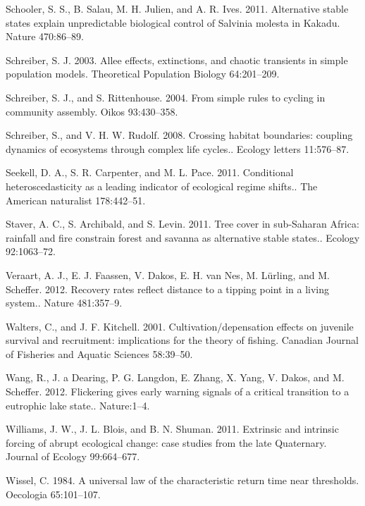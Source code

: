 \documentclass{article}
\begin{document}
Schooler, S. S., B. Salau, M. H. Julien, and A. R. Ives. 2011.
Alternative stable states explain unpredictable biological control of
Salvinia molesta in Kakadu. Nature 470:86--89.

Schreiber, S. J. 2003. Allee effects, extinctions, and chaotic
transients in simple population models. Theoretical Population Biology
64:201--209.

Schreiber, S. J., and S. Rittenhouse. 2004. From simple rules to cycling
in community assembly. Oikos 93:430--358.

Schreiber, S., and V. H. W. Rudolf. 2008. Crossing habitat boundaries:
coupling dynamics of ecosystems through complex life cycles.. Ecology
letters 11:576--87.

Seekell, D. A., S. R. Carpenter, and M. L. Pace. 2011. Conditional
heteroscedasticity as a leading indicator of ecological regime shifts..
The American naturalist 178:442--51.

Staver, A. C., S. Archibald, and S. Levin. 2011. Tree cover in
sub-Saharan Africa: rainfall and fire constrain forest and savanna as
alternative stable states.. Ecology 92:1063--72.

Veraart, A. J., E. J. Faassen, V. Dakos, E. H. van Nes, M. Lürling, and
M. Scheffer. 2012. Recovery rates reflect distance to a tipping point in
a living system.. Nature 481:357--9.

Walters, C., and J. F. Kitchell. 2001. Cultivation/depensation effects
on juvenile survival and recruitment: implications for the theory of
fishing. Canadian Journal of Fisheries and Aquatic Sciences 58:39--50.

Wang, R., J. a Dearing, P. G. Langdon, E. Zhang, X. Yang, V. Dakos, and
M. Scheffer. 2012. Flickering gives early warning signals of a critical
transition to a eutrophic lake state.. Nature:1--4.

Williams, J. W., J. L. Blois, and B. N. Shuman. 2011. Extrinsic and
intrinsic forcing of abrupt ecological change: case studies from the
late Quaternary. Journal of Ecology 99:664--677.

Wissel, C. 1984. A universal law of the characteristic return time near
thresholds. Oecologia 65:101--107.
\end{document}
